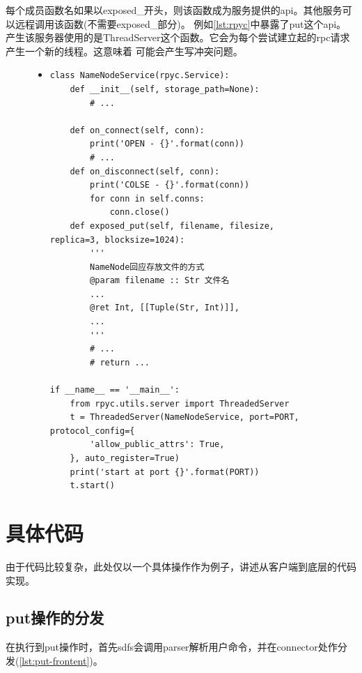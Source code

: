 \documentclass[a4paper]{article}
\begin{document}
每个成员函数名如果以exposed\_开头，则该函数成为服务提供的api。其他服务可以远程调用该函数(不需要exposed\_部分)。
例如\autoref{lst:rpyc}中暴露了put这个api。\\

产生该服务器使用的是ThreadServer这个函数。它会为每个尝试建立起的rpc请求产生一个新的线程。这意味着
可能会产生写冲突问题。
\begin{figure}[!hbt]
\begin{itemize}
\item[] \begin{lstlisting}[style=mypython, label=lst:rpyc, caption=rpyc库简介]
class NameNodeService(rpyc.Service):
    def __init__(self, storage_path=None):
        # ...

    def on_connect(self, conn):
        print('OPEN - {}'.format(conn))
        # ...
    def on_disconnect(self, conn):
        print('COLSE - {}'.format(conn))
        for conn in self.conns:
            conn.close()
    def exposed_put(self, filename, filesize, replica=3, blocksize=1024):
        '''
        NameNode回应存放文件的方式
        @param filename :: Str 文件名
        ...
        @ret Int, [[Tuple(Str, Int)]], 
        ...
        '''
        # ...
        # return ...

if __name__ == '__main__':
    from rpyc.utils.server import ThreadedServer
    t = ThreadedServer(NameNodeService, port=PORT, protocol_config={
        'allow_public_attrs': True,
    }, auto_register=True)
    print('start at port {}'.format(PORT))
    t.start()
\end{lstlisting}
\end{itemize}
\end{figure}

\section{具体代码}
由于代码比较复杂，此处仅以一个具体操作作为例子，讲述从客户端到底层的代码实现。
\subsection{put操作的分发}
在执行到put操作时，首先sdfs会调用parser解析用户命令，并在connector处作分发(\autoref{lst:put-frontent})。\\
\end{document}
